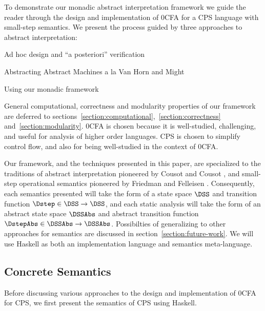 
To demonstrate our monadic abstract interpretation framework we guide the
reader through the design and implementation of 0CFA for a CPS language with
small-step semantics.
%
We present the process guided by three approaches to abstract interpretation:
%
\begin{itemizenobreak}
  \item Ad hoc design and ``a posteriori'' verification
  \item Abstracting Abstract Machines a la Van Horn and Might~\cite{van-horn:2010:aam}
  \item Using our monadic framework
\end{itemizenobreak}
%
General computational, correctness and modularity properties of our framework
are deferred to sections~\ref{section:computational},~\ref{section:correctness}
and~\ref{section:modularity}.
%
0CFA is chosen because it is well-studied, challenging, and useful for analysis of
higher order languages.
%
CPS is chosen to simplify control flow, and also for being well-studied in the
context of 0CFA.


Our framework, and the techniques presented in this paper, are specialized to
the traditions of abstract interpretation pioneered by Cousot and Cousot
\cite{cousot:1977:ai}, and small-step operational semantics pioneered by
Friedman and Felleisen \cite{felleisen:1986:cek}.
%
Consequently, each semantics presented will take the form of a state space
$\DSS$ and transition function $\Dstep \in \DSS \to \DSS$, and each static
analysis will take the form of an abstract state space $\DSSAbs$ and abstract
transition function $\DstepAbs \in \DSSAbs \to \DSSAbs$.
%
Possibilties of generalizing to other approaches for semantics are discussed in
section~\ref{section:future-work}.
%
We will use Haskell as both an implementation language and semantics
meta-language.


\subsection{Concrete Semantics}

Before discussing various approaches to the design and implementation of 0CFA
for CPS, we first present the semantics of CPS using Haskell.



